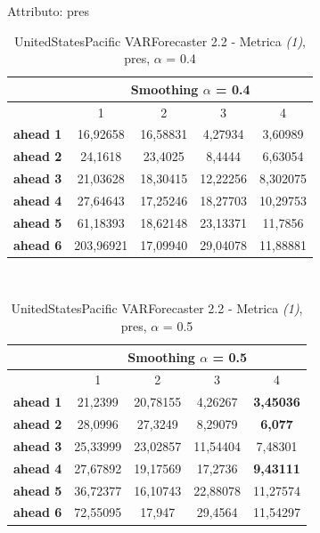 \documentclass[12pt,a4paper,oneside,openright]{book}
\begin{document}
\medskip

Attributo: pres \\ 

\begin{table}[H]
\centering
\begin{tabular}{|c|c|c|c|c|}
\hline
 & \multicolumn{4}{|c|}{Smoothing $\alpha$ = 0.4} \\
\hline
& 1 & 2 & 3 & 4 \\
\hline
\textbf{ahead 1} & 16,92658 & 16,58831 & 4,27934 & 3,60989 \\
\hline
\textbf{ahead 2} & 24,1618 & 23,4025 & 8,4444 & 6,63054\\ 
\hline
\textbf{ahead 3} & 21,03628 & 18,30415 & 12,22256 & 8,302075\\
\hline
\textbf{ahead 4} & 27,64643 & 17,25246 & 18,27703 & 10,29753\\ 
\hline
\textbf{ahead 5} & 61,18393 & 18,62148 & 23,13371 & 11,7856\\
\hline
\textbf{ahead 6} & 203,96921 & 17,09940 & 29,04078 & 11,88881\\ 
\hline
\end{tabular} \\
\caption{UnitedStatesPacific VARForecaster 2.2 - Metrica \textit{(1)}, pres, $\alpha$ = 0.4}
\end{table} 

\medskip

\begin{table}[H]
\centering
\begin{tabular}{|c|c|c|c|c|}
\hline
 & \multicolumn{4}{|c|}{Smoothing $\alpha$ = 0.5} \\
\hline
& 1 & 2 & 3 & 4 \\
\hline
\textbf{ahead 1} & 21,2399 & 20,78155 & 4,26267 & \textbf{3,45036}\\
\hline
\textbf{ahead 2} & 28,0996 & 27,3249 & 8,29079 & \textbf{6,077}\\ 
\hline
\textbf{ahead 3} & 25,33999 & 23,02857 & 11,54404 & 7,48301\\
\hline
\textbf{ahead 4} & 27,67892 & 19,17569 & 17,2736 & \textbf{9,43111}\\ 
\hline
\textbf{ahead 5} & 36,72377 & 16,10743 & 22,88078 & 11,27574\\
\hline
\textbf{ahead 6} & 72,55095 & 17,947 & 29,4564 & 11,54297\\ 
\hline
\end{tabular} \\
\caption{UnitedStatesPacific VARForecaster 2.2 - Metrica \textit{(1)}, pres, $\alpha$ = 0.5}
\end{table} 
\end{document}

